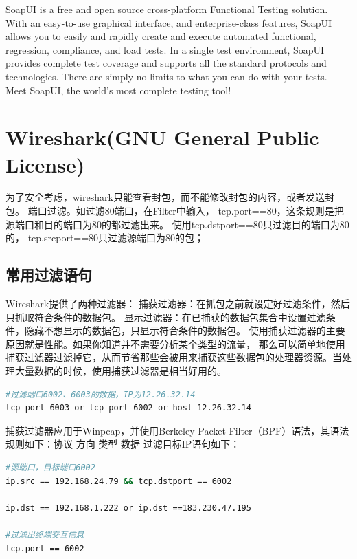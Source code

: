 \documentclass{book}
\begin{document}
SoapUI is a free and open source cross-platform Functional Testing solution. 
With an easy-to-use graphical interface, and enterprise-class features, 
SoapUI allows you to easily and rapidly create and execute automated functional, 
regression, compliance, and load tests. In a single test environment, 
SoapUI provides complete test coverage and supports all the standard protocols 
and technologies. There are simply no limits to what you can do with your tests. 
Meet SoapUI, the world's most complete testing tool!

\section{Wireshark(GNU General Public License)}

为了安全考虑，wireshark只能查看封包，而不能修改封包的内容，或者发送封包。
端口过滤。如过滤80端口，在Filter中输入，
tcp.port==80，这条规则是把源端口和目的端口为80的都过滤出来。
使用tcp.dstport==80只过滤目的端口为80的，
tcp.srcport==80只过滤源端口为80的包；

\subsection{常用过滤语句}


Wireshark提供了两种过滤器：
捕获过滤器：在抓包之前就设定好过滤条件，然后只抓取符合条件的数据包。
显示过滤器：在已捕获的数据包集合中设置过滤条件，隐藏不想显示的数据包，只显示符合条件的数据包。
使用捕获过滤器的主要原因就是性能。如果你知道并不需要分析某个类型的流量，
那么可以简单地使用捕获过滤器过滤掉它，从而节省那些会被用来捕获这些数据包的处理器资源。当处理大量数据的时候，使用捕获过滤器是相当好用的。

\begin{lstlisting}[language=Bash]
#过滤端口6002、6003的数据，IP为12.26.32.14
tcp port 6003 or tcp port 6002 or host 12.26.32.14
\end{lstlisting}

捕获过滤器应用于Winpcap，并使用Berkeley Packet Filter（BPF）语法，其语法规则如下：协议 方向 类型 数据
过滤目标IP语句如下：

\begin{lstlisting}[language=Bash]
#源端口，目标端口6002
ip.src == 192.168.24.79 && tcp.dstport == 6002

ip.dst == 192.168.1.222 or ip.dst ==183.230.47.195

#过滤出终端交互信息
tcp.port == 6002
\end{lstlisting}
\end{document}
